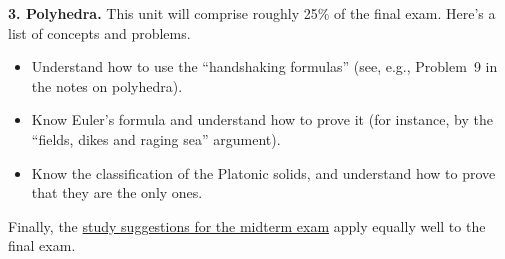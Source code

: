 \textbf{3. Polyhedra.}  This unit will comprise roughly 25\% of the
final exam.  Here's a list of concepts and problems.

\begin{itemize}
\item Understand how to use the ``handshaking formulas'' (see, e.g.,
Problem~9 in the notes on polyhedra).

\item Know Euler's formula and understand how to prove it (for instance,
by the ``fields, dikes and raging sea'' argument).

\item Know the classification of the Platonic solids,
and understand how to prove that they are the only ones.
\end{itemize}

Finally, the \href{http://www.jlmartin.faculty.ku.edu/math409/midterm-review.pdf}{study suggestions for the midterm exam} apply
equally well to the final exam.


